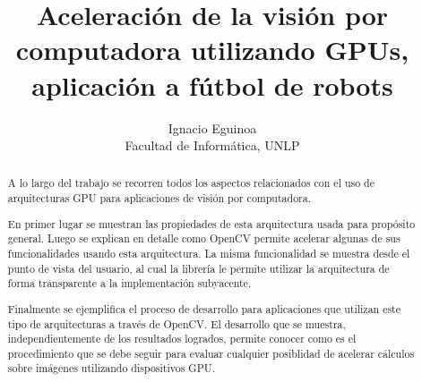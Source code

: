 \documentclass[a4paper,10pt]{report}
\title{Aceleración de la visión por computadora utilizando GPUs, aplicación a fútbol de robots}
\author{Ignacio Eguinoa \\
\small Facultad de Informática, UNLP}
\date{}
\begin{document}
\maketitle


\begin{abstract}





A lo largo del trabajo se recorren todos los aspectos relacionados con el uso de arquitecturas GPU para aplicaciones de visión por computadora. 

En primer lugar se muestran las propiedades de esta arquitectura usada para propósito general. 
Luego se explican en detalle como OpenCV permite acelerar algunas de sus funcionalidades usando esta arquitectura. La misma funcionalidad se muestra desde el punto de vista del usuario, al cual la librería le permite utilizar la arquitectura de forma transparente a la implementación subyacente.

Finalmente se ejemplifica el proceso de desarrollo para aplicaciones que utilizan este tipo de arquitecturas a través de OpenCV. 
El desarrollo que se muestra, independientemente de los resultados logrados, permite conocer como es el procedimiento que se debe seguir para evaluar cualquier posiblidad de acelerar cálculos sobre imágenes utilizando dispositivos GPU.

\end{abstract}


\tableofcontents
\end{document}
